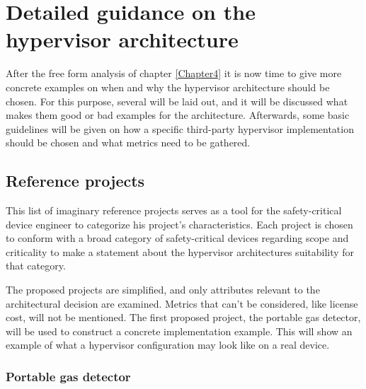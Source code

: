 
\chapter{Detailed guidance on the hypervisor architecture} %

\label{Chapter5} %



After the free form analysis of chapter \ref{Chapter4} it is now time to give more concrete examples on when and why the hypervisor architecture should be chosen. For this purpose, several  will be laid out, and it will be discussed what makes them good or bad examples for the architecture. Afterwards, some basic guidelines will be given on how a specific third-party hypervisor implementation should be chosen and what metrics need to be gathered.
\section{Reference projects} \label{ref-projects}
This list of imaginary reference projects serves as a tool for the safety-critical device engineer to categorize his project's characteristics. Each project is chosen to conform with a broad category of safety-critical devices regarding scope and criticality to make a statement about the hypervisor architectures suitability for that category. 

The proposed projects are simplified, and only attributes relevant to the architectural decision are examined. Metrics that can't be considered, like license cost, will not be mentioned. The first proposed project, the portable gas detector, will be used to construct a concrete implementation example. This will show an example of what a hypervisor configuration may look like on a real device.

\subsection{Portable gas detector}
